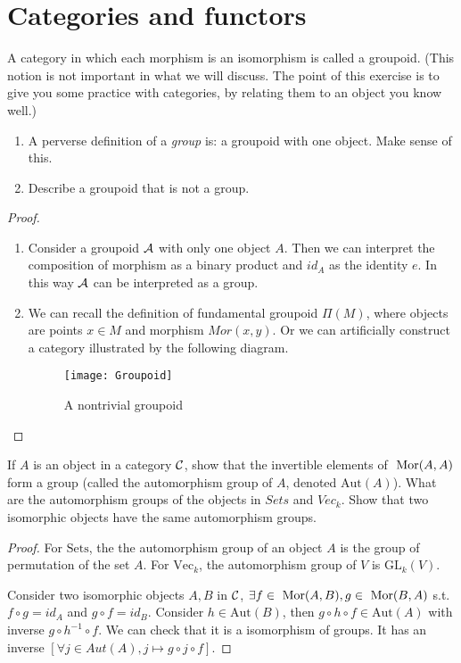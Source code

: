 \documentclass[11pt,fleqn]{book} %
\begin{document}
\section{Categories and functors}
\begin{exr}
A category in which each morphism is an isomorphism is called a groupoid. (This notion is not important in what we will discuss. The point of this exercise is to give you some practice with categories, by relating them to an object you know well.)
\begin{enumerate}[label=(\alph*)]
\item A perverse definition of a \textit{group} is: a groupoid with one object. Make sense of this.
\item Describe a groupoid that is not a group.
\end{enumerate}
\end{exr}
\begin{proof}\ 
\begin{enumerate}[label=(\alph*)]
\item Consider a groupoid ${\cal A}$ with only one object $A$. Then we can interpret the composition of morphism as a binary product and $id_A$ as the identity $e$. In this way ${\cal A}$ can be interpreted as a group.
\item We can recall the definition of fundamental groupoid $\Pi(M)$, where objects are points $x\in M$ and morphism $Mor(x,y)$. Or we can artificially construct a category illustrated by the following diagram.
\begin{figure}[h]
\centering\texttt{[image: Groupoid]}
\caption{A nontrivial groupoid}
\end{figure}
\end{enumerate}
\end{proof}

\begin{exr}
If $A$ is an object in a category ${\cal C}$, show that the invertible elements of $\text{ Mor}(A, A)$ form a group (called the automorphism group of $A$, denoted $\text{Aut}(A)$). What are the automorphism groups of the objects in $\mathit{Sets}$ and $\mathit{Vec}_k$. Show that two isomorphic objects have the same automorphism groups.
\end{exr}
\begin{proof}
For $\text{Sets}$, the the automorphism group of an object $A$ is the group of permutation of the set $A$. For $\text{Vec}_k$, the automorphism group of $V$ is $\text{GL}_k(V)$. 

Consider two isomorphic objects $A,B$ in ${\cal C}$, $\exists f\in \text{ Mor}(A,B), g\in\text{ Mor}(B,A)$ s.t. $f\circ g=id_A$ and $g\circ f=id_B$. Consider $h\in\text{Aut}(B)$, then $g\circ h\circ f\in \text{Aut}(A)$ with inverse $g\circ h^{-1} \circ f$. We can check that it is a isomorphism of groups. It has an inverse $[\forall j\in Aut(A),j\longmapsto g\circ j\circ f]$.
\end{proof}
\end{document}
